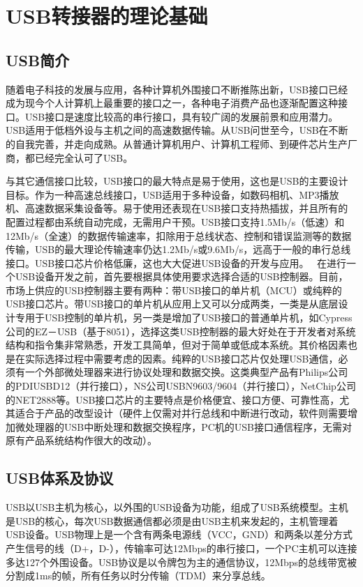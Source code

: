 
\chapter{USB转接器的理论基础}
\section{USB简介}
随着电子科技的发展与应用，各种计算机外围接口不断推陈出新，USB接口已经成为现今个人计算机上最重要的接口之一，各种电子消费产品也逐渐配置这种接口。USB接口是速度比较高的串行接口，具有较广阔的发展前景和应用潜力。USB适用于低档外设与主机之间的高速数据传输。从USB问世至今，USB在不断的自我完善，并走向成熟。从普通计算机用户、计算机工程师、到硬件芯片生产厂商，都已经完全认可了USB。

与其它通信接口比较，USB接口的最大特点是易于使用，这也是USB的主要设计目标。作为一种高速总线接口，USB适用于多种设备，如数码相机、MP3播放机、高速数据采集设备等。易于使用还表现在USB接口支持热插拔，并且所有的配置过程都由系统自动完成，无需用户干预。USB接口支持1.5Mb/s（低速）和12Mb/s（全速）的数据传输速率，扣除用于总线状态、控制和错误监测等的数据传输，USB的最大理论传输速率仍达1.2Mb/s或9.6Mb/s，远高于一般的串行总线接口。USB接口芯片价格低廉，这也大大促进USB设备的开发与应用。 
在进行一个USB设备开发之前，首先要根据具体使用要求选择合适的USB控制器。目前，市场上供应的USB控制器主要有两种：带USB接口的单片机（MCU）或纯粹的USB接口芯片。带USB接口的单片机从应用上又可以分成两类，一类是从底层设计专用于USB控制的单片机，另一类是增加了USB接口的普通单片机，如Cypress公司的EZ－USB（基于8051），选择这类USB控制器的最大好处在于开发者对系统结构和指令集非常熟悉，开发工具简单，但对于简单或低成本系统。其价格因素也是在实际选择过程中需要考虑的因素。纯粹的USB接口芯片仅处理USB通信，必须有一个外部微处理器来进行协议处理和数据交换。这类典型产品有Philips公司的PDIUSBD12（并行接口），NS公司USBN9603/9604（并行接口），NetChip公司的NET2888等。USB接口芯片的主要特点是价格便宜、接口方便、可靠性高，尤其适合于产品的改型设计（硬件上仅需对并行总线和中断进行改动，软件则需要增加微处理器的USB中断处理和数据交换程序，PC机的USB接口通信程序，无需对原有产品系统结构作很大的改动）。
\section{USB体系及协议}
USB以USB主机为核心，以外围的USB设备为功能，组成了USB系统模型。主机是USB的核心，每次USB数据通信都必须是由USB主机来发起的，主机管理着USB设备。USB物理上是一个含有两条电源线（VCC，GND）和两条以差分方式产生信号的线（D+，D-），传输率可达12Mbps的串行接口，一个PC主机可以连接多达127个外围设备。USB协议是以令牌包为主的通信协议，12Mbps的总线带宽被分割成1ms的帧，所有任务以时分传输（TDM）来分享总线。






